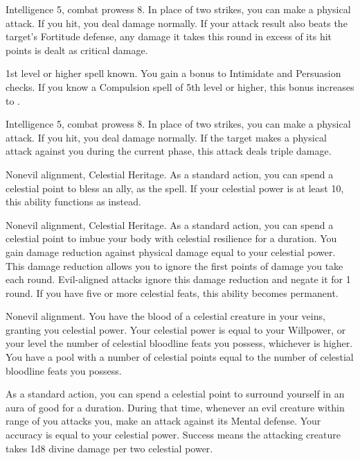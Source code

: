 \featpre Intelligence 5, combat prowess 8.
\featben In place of two strikes, you can make a physical attack.
If you hit, you deal damage normally.
If your attack result also beats the target's Fortitude defense, any damage it takes this round in excess of its hit points is dealt as critical damage.

\featpre 1st level or higher  spell known.
\featben You gain a  bonus to Intimidate and Persuasion checks.
If you know a Compulsion spell of 5th level or higher, this bonus increases to .

\featpres Intelligence 5, combat prowess 8.
\featben In place of two strikes, you can make a physical attack.
If you hit, you deal damage normally.
If the target makes a physical attack against you during the current phase, this attack deals triple damage.

\featpres Nonevil alignment, Celestial Heritage.
\featben As a standard action, you can spend a celestial point to bless an ally, as the  spell.
If your celestial power is at least 10, this ability functions as  instead.

\featpres Nonevil alignment, Celestial Heritage.
\featben As a standard action, you can spend a celestial point to imbue your body with celestial resilience for a \durshort duration.
You gain damage reduction against physical damage equal to your celestial power.
This damage reduction allows you to ignore the first points of damage you take each round.
Evil-aligned attacks ignore this damage reduction and negate it for 1 round.
If you have five or more celestial feats, this ability becomes permanent.

\featpre Nonevil alignment.
\featben You have the blood of a celestial creature in your veins, granting you celestial power.
Your celestial power is equal to your Willpower, or your level \add the number of celestial bloodline feats you possess, whichever is higher.
You have a pool with a number of celestial points equal to the number of celestial bloodline feats you possess.

As a standard action, you can spend a celestial point to surround yourself in an aura of good for a \durshort duration.
During that time, whenever an evil creature within \rngclose range of you attacks you, make an attack against its Mental defense.
Your accuracy is equal to your celestial power.
Success means the attacking creature takes 1d8 divine damage per two celestial power.

